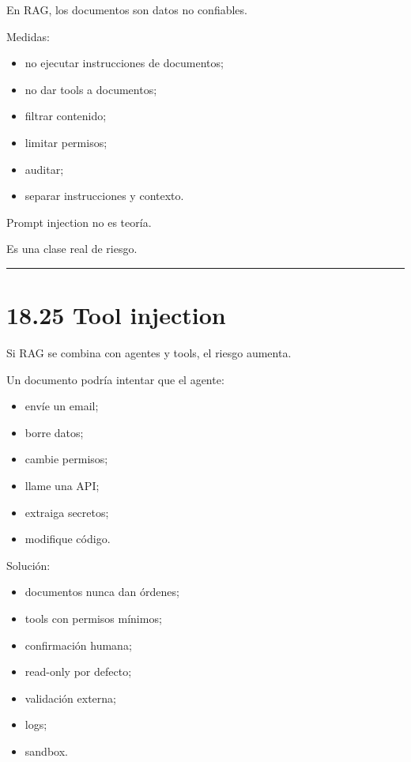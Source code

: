 En RAG, los documentos son datos no confiables.

Medidas:

\begin{itemize}
\tightlist
\item
  no ejecutar instrucciones de documentos;
\item
  no dar tools a documentos;
\item
  filtrar contenido;
\item
  limitar permisos;
\item
  auditar;
\item
  separar instrucciones y contexto.
\end{itemize}

Prompt injection no es teoría.

Es una clase real de riesgo.

\begin{center}\rule{0.5\linewidth}{0.5pt}\end{center}

\section{18.25 Tool injection}\label{tool-injection}

Si RAG se combina con agentes y tools, el riesgo aumenta.

Un documento podría intentar que el agente:

\begin{itemize}
\tightlist
\item
  envíe un email;
\item
  borre datos;
\item
  cambie permisos;
\item
  llame una API;
\item
  extraiga secretos;
\item
  modifique código.
\end{itemize}

Solución:

\begin{itemize}
\tightlist
\item
  documentos nunca dan órdenes;
\item
  tools con permisos mínimos;
\item
  confirmación humana;
\item
  read-only por defecto;
\item
  validación externa;
\item
  logs;
\item
  sandbox.
\end{itemize}

